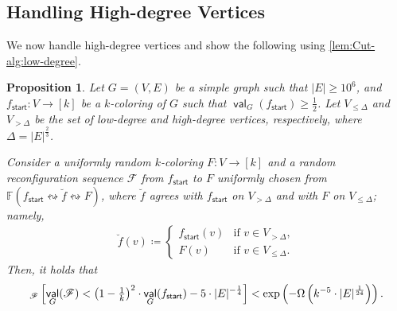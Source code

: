 \documentclass[11pt,fleqn]{article}
\renewcommand{\geq}{\geqslant}
\renewcommand{\leq}{\leqslant}
\newcommand{\reco}{\leftrightsquigarrow}
\newcommand{\defeq}{\coloneq}
\DeclareMathOperator{\val}{\mathsf{val}}
\newcommand{\sss}{\mathsf{start}}
\newcommand{\f}{f}
\newcommand{\frnd}{F}
\newcommand{\sqcol}{\scrF}
\newcommand{\stsqcol}{\bbF}
\newcommand{\Vl}{V_{\leq \Delta}}
\newcommand{\Vg}{V_{> \Delta}}
\newcommand{\bbF}{\mathbb{F}}
\newcommand{\scrF}{\mathscr{F}}
\let\Pr\relax\DeclareMathOperator*{\Pr}{\mathbb{P}}
\newtheorem{proposition}[theorem]{Proposition}
\theoremstyle{definition}
\numberwithin{equation}{section}
\begin{document}
\subsection{Handling High-degree Vertices}
\label{subsec:Cut-alg:high-degree}

We now handle high-degree vertices and show the following using \cref{lem:Cut-alg:low-degree}.

\begin{proposition}
\label{prp:Cut-alg:high-prob}
    Let $G=(V,E)$ be a simple graph such that $|E| \geq 10^6$, and
    $\f_\sss \colon V \to [k]$ be a $k$-coloring of $G$ such that
    $\val_G(\f_\sss) \geq \frac{1}{2}$.
    Let
    $\Vl$ and $\Vg$ be the set of low-degree and high-degree vertices, respectively,
    where $\Delta = |E|^\frac{2}{3}$.

    Consider a uniformly random $k$-coloring $\frnd \colon V \to [k]$ and
    a random reconfiguration sequence $\sqcol$ from $\f_\sss$ to $\frnd$
    uniformly chosen from $\stsqcol(\f_\sss \reco \breve{\f} \reco \frnd)$, where
    $\breve{\f}$ agrees
    with $\f_\sss$ on $\Vg$ and
    with $\frnd$ on $\Vl$; namely,
    \begin{align}
        \breve{\f}(v) \defeq
        \begin{cases}
            \f_\sss(v) & \text{if } v \in \Vg, \\
            \frnd(v) & \text{if } v \in \Vl.
        \end{cases}
    \end{align}
    Then, it holds that
    \begin{align}
        \Pr_{\sqcol}\left[
            \val_G(\sqcol)
            < \left(1-\tfrac{1}{k}\right)^2 \cdot \val_G(\f_\sss) - 5 \cdot |E|^{-\frac{1}{4}}
        \right]
        < \exp\left(- \Omega\left(k^{-5} \cdot |E|^{\frac{1}{24}}\right)\right).
    \end{align}
\end{proposition}
\end{document}
